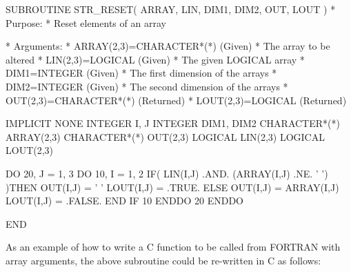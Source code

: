 \documentclass[twoside,11pt,nolof]{starlink}
\begin{document}
\begin{small}
\begin{terminalv}
      SUBROUTINE STR_RESET( ARRAY, LIN, DIM1, DIM2, OUT, LOUT )
*  Purpose:
*     Reset elements of an array

*  Arguments:
*     ARRAY(2,3)=CHARACTER*(*) (Given)
*        The array to be altered
*     LIN(2,3)=LOGICAL (Given)
*        The given LOGICAL array
*     DIM1=INTEGER (Given)
*        The first dimension of the arrays
*     DIM2=INTEGER (Given)
*        The second dimension of the arrays
*     OUT(2,3)=CHARACTER*(*) (Returned)
*     LOUT(2,3)=LOGICAL (Returned)

      IMPLICIT NONE
      INTEGER I, J
      INTEGER DIM1, DIM2
      CHARACTER*(*) ARRAY(2,3)
      CHARACTER*(*) OUT(2,3)
      LOGICAL LIN(2,3)
      LOGICAL LOUT(2,3)

      DO 20, J = 1, 3
         DO 10, I = 1, 2
            IF( LIN(I,J) .AND. (ARRAY(I,J) .NE. ' ') )THEN
               OUT(I,J) = ' '
               LOUT(I,J) = .TRUE.
            ELSE
               OUT(I,J) = ARRAY(I,J)
               LOUT(I,J) = .FALSE.
            END IF
10       ENDDO
20    ENDDO

      END
\end{terminalv}
\end{small}

As an example of how to write a C function to be called from FORTRAN with array
arguments, the above subroutine could be re-written in C as follows:
\end{document}
